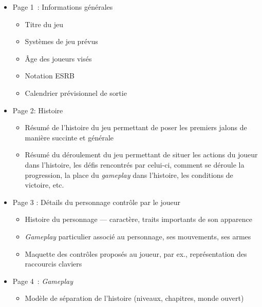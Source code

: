 

\begin{table}
\footnotesize
\begin{framed}
\begin{itemize}
    \item Page 1~: Informations générales
    \begin{itemize}
        \item Titre du jeu
        \item Systèmes de jeu prévus
        \item \^Age des joueurs visés
        \item Notation ESRB
        \item Calendrier prévisionnel de sortie
    \end{itemize}
    \item Page 2: Histoire
    \begin{itemize}
        \item  Résumé de l'histoire du jeu permettant de poser les premiers jalons de manière succinte et générale
        \item Résumé du déroulement du jeu  permettant de situer les actions du joueur dans l'histoire, les d\'efis rencontrés par celui-ci, comment se déroule la progression, la place du \emph{gameplay} dans l'histoire, les conditions de victoire, etc.
    \end{itemize}
    \item Page 3 : Détails du personnage contr\^ole par le joueur
    \begin{itemize}
        \item Histoire du personnage --- caractère, traits importants de son apparence
        \item \emph{Gameplay} particulier associé au personnage, ses mouvements, ses armes
        \item Maquette des contrôles proposés au joueur, par ex., représentation des raccourcis claviers
    \end{itemize}
    \item Page 4~: \emph{Gameplay}
    \begin{itemize}
        \item Modèle de séparation de l'histoire (niveaux, chapitres, monde ouvert)

\end{itemize}
\end{itemize}
\end{framed}
\end{table}
